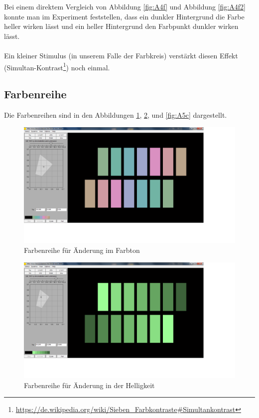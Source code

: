 \documentclass[a4paper]{article}
\begin{document}
Bei einem direktem Vergleich von Abbildung \ref{fig:A4f} und Abbildung \ref{fig:A4f2} konnte man im Experiment feststellen, dass ein dunkler Hintergrund die Farbe heller wirken lässt und ein heller Hintergrund den Farbpunkt dunkler wirken lässt. \\ \\
Ein kleiner Stimulus (in unserem Falle der Farbkreis) verstärkt diesen Effekt (Simultan-Kontrast\footnote{\url{https://de.wikipedia.org/wiki/Sieben_Farbkontraste#Simultankontrast}}) noch einmal. 

\newpage
\subsection{Farbenreihe}
Die Farbenreihen sind in den Abbildungen \ref{fig:A5a}, \ref{fig:A5b}, und \ref{fig:A5c} dargestellt.
\begin{figure}[H]
    \centering
    \includegraphics[width=\textwidth]{images/A5_Farbton.png}
    \caption{Farbenreihe für Änderung im Farbton}
    \label{fig:A5a}
\end{figure}
\begin{figure}[H]
    \centering
    \includegraphics[width=\textwidth]{images/A5_Helligkeit.png}
    \caption{Farbenreihe für Änderung in der Helligkeit}
    \label{fig:A5b}
\end{figure}
\end{document}
